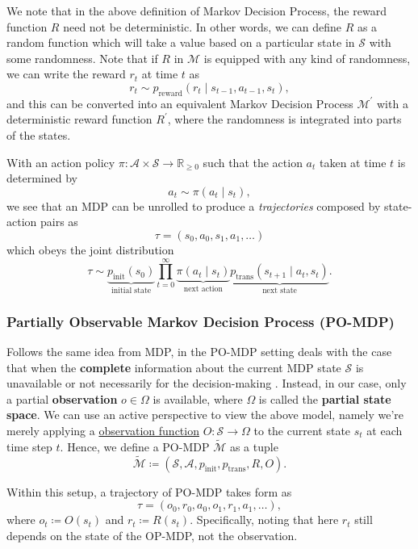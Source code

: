 \documentclass{article}
\begin{document}
We note that in the above definition of Markov Decision Process, the reward function \(R\) need not be deterministic. In other words, we can define \(R\) as a random function
which will take a value based on a particular state in \(\mathcal{S}\) with some randomness. Note that if \(R\) in \(\mathcal{M}\) is equipped with any kind of randomness, we can
write the reward \(r_t\) at time \(t\) as
\[
	r_t\sim p_{\mathrm{reward}}(r_t\mid s_{t-1}, a_{t-1}, s_t),
\]
and this can be converted into an equivalent Markov Decision Process \(\mathcal{M}^\prime\) with a deterministic reward function \(R^\prime\), where the randomness is integrated
into parts of the states.

With an action policy \(\pi \colon \mathcal{A}\times \mathcal{S}\to \mathbb{R}_{\geq 0}\) such that the action \(a_t\) taken at time \(t\) is determined by
\[
	a_t\sim \pi(a_t\mid s_t),
\]
we see that an MDP can be unrolled to produce a \emph{trajectories} composed by state-action pairs as
\[
	\tau = (s_0, a_0, s_1, a_1, \ldots)
\]
which obeys the joint distribution
\[
	\tau \sim \underbrace{p_{\mathrm{init}}(s_0)}_{\text{initial state}}\prod_{t = 0}^{\infty} \underbrace{\pi(a_t\mid s_t)}_{\text{next action}}\underbrace{p_{\mathrm{trans}}(s_{t+1}\mid a_t, s_t)}_{\text{next state}}.
\]

\subsubsection{Partially Observable Markov Decision Process (PO-MDP)}
Follows the same idea from MDP, in the PO-MDP setting deals with the case that when the \textbf{complete} information about the current MDP state \(\mathcal{S}\) is unavailable
or not necessarily for the decision-making \cite{ASTROM1965174}. Instead, in our case, only a partial \textbf{observation} \(o\in \Omega\) is available, where \(\Omega\) is called the
\textbf{partial state space}. We can use an active perspective to view the above model, namely we're merely applying a \underline{observation function}
\(O\colon \mathcal{S}\to \Omega\) to the current state \(s_t\) at each time step \(t\).  Hence, we define a PO-MDP \(\widetilde{\mathcal{M}}\) as a tuple
\[
	\widetilde{\mathcal{M}} \coloneqq (\mathcal{S}, \mathcal{A}, p_{\mathrm{init}}, p_{\mathrm{trans}}, R, O).
\]

Within this setup, a trajectory of PO-MDP takes form as
\[
	\tau = (o_0, r_0, a_0, o_1, r_1, a_1, \ldots),
\]
where \(o_t\coloneqq O(s_t)\) and \(r_t\coloneqq R(s_t)\). Specifically, noting that here \(r_t\) still depends on the state of the OP-MDP, not the observation.
\end{document}
